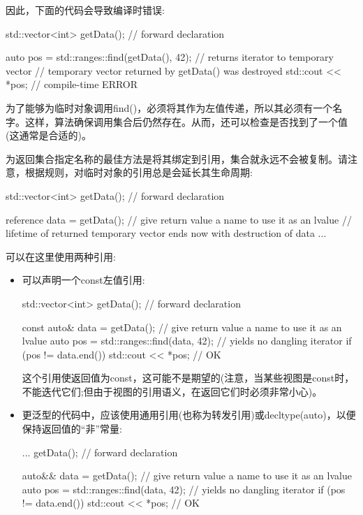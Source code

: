 因此，下面的代码会导致编译时错误:

\begin{cpp}
std::vector<int> getData(); // forward declaration

auto pos = std::ranges::find(getData(), 42); // returns iterator to temporary vector
// temporary vector returned by getData() was destroyed
std::cout << *pos; // compile-time ERROR
\end{cpp}

为了能够为临时对象调用find()，必须将其作为左值传递，所以其必须有一个名字。这样，算法确保调用集合后仍然存在。从而，还可以检查是否找到了一个值(这通常是合适的)。

为返回集合指定名称的最佳方法是将其绑定到引用，集合就永远不会被复制。请注意，根据规则，对临时对象的引用总是会延长其生命周期:

\begin{cpp}
std::vector<int> getData(); // forward declaration

reference data = getData(); // give return value a name to use it as an lvalue
// lifetime of returned temporary vector ends now with destruction of data
...
\end{cpp}

可以在这里使用两种引用:

\begin{itemize}
\item
可以声明一个const左值引用:

\begin{cpp}
std::vector<int> getData(); // forward declaration

const auto& data = getData(); // give return value a name to use it as an lvalue
auto pos = std::ranges::find(data, 42); // yields no dangling iterator
if (pos != data.end()) {
	std::cout << *pos; // OK
}
\end{cpp}

这个引用使返回值为const，这可能不是期望的(注意，当某些视图是const时，不能迭代它们;但由于视图的引用语义，在返回它们时必须非常小心)。

\item
更泛型的代码中，应该使用通用引用(也称为转发引用)或decltype(auto)，以便保持返回值的“非”常量:

\begin{cpp}
... getData(); // forward declaration

auto&& data = getData(); // give return value a name to use it as an lvalue
auto pos = std::ranges::find(data, 42); // yields no dangling iterator
if (pos != data.end()) {
	std::cout << *pos; // OK
}
\end{cpp}
\end{itemize}

